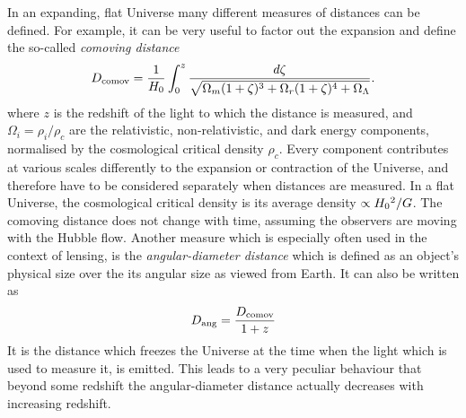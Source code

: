 In an expanding, flat Universe many different measures of distances can be
defined.  For example, it can be very useful to factor out the expansion and
define the so-called \textit{comoving distance}
%
\begin{equation}\eqlbl{d_comov}%
    D_{\mathrm{comov}} = \frac{1}{\Ho} \int_0^{z} \frac{d\zeta}{\sqrt{\Omega_m(1+\zeta)^3
    + \Omega_r(1+\zeta)^4 + \Omega_\Lambda}}.
\end{equation}
%
where $z$ is the redshift of the light to which the distance is measured, and
$\Omega_i=\rho_i/\rho_c$ are the relativistic, non-relativistic, and dark energy
components, normalised by the cosmological critical density $\rho_c$.  Every
component contributes at various scales differently to the expansion or
contraction of the Universe, and therefore have to be considered separately when
distances are measured.  In a flat Universe, the cosmological critical density
is its average density $\propto H_{0}{}^{2}/G$.  The comoving distance does not change with time,
assuming the observers are moving with the Hubble flow.  Another measure which
is especially often used in the context of lensing, is the
\textit{angular-diameter distance} which is defined as an object's physical size
over the its angular size as viewed from Earth. It can also be written as
%
\begin{equation}\eqlbl{d_ang}%
    D_{\mathrm{ang}} = \frac{D_{\mathrm{comov}}}{1+z}
\end{equation}
%
It is the distance which freezes the Universe at the time when the light which
is used to measure it, is emitted.  This leads to a very peculiar behaviour that
beyond some redshift the angular-diameter distance actually decreases with
increasing redshift.

